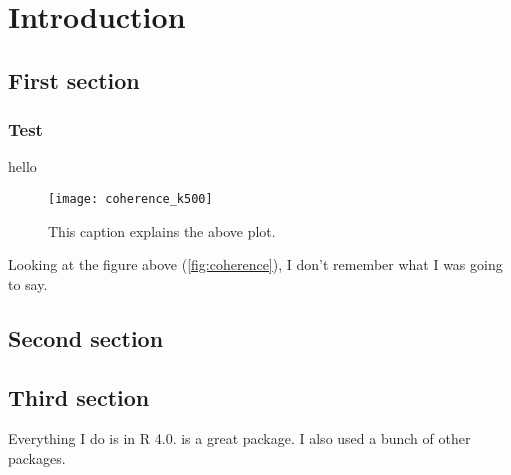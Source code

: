 \chapter{Introduction}

\section{First section}
\subsection{Test}
hello

\lipsum[3-4]

\begin{figure}[h]
	\centering
	\texttt{[image: coherence\_k500]}
	\caption{\label{fig:coherence}This caption explains the above plot.}
\end{figure}

\lipsum[5]
Looking at the figure above (\autoref{fig:coherence}), I don't remember what I was going to say.


\section{Second section}

\lipsum[6-7]

\section{Third section}

Everything I do is in R 4.0\citep{R-4.0.0}. \citep{purrr} is a great package. I also used a
bunch of other packages\citep{qs,dplyr,ggplot2}.
